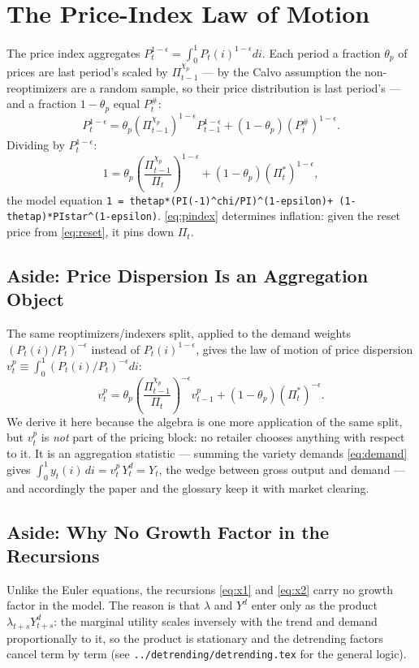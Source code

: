 \documentclass[11pt]{article}
\begin{document}
\section{The Price-Index Law of Motion}

The price index aggregates $P_t^{1-\epsilon} = \int_0^1 P_t(i)^{1-\epsilon}di$.
Each period a fraction $\theta_p$ of prices are last period's scaled by
$\Pi_{t-1}^{\chi_p}$ --- by the Calvo assumption the non-reoptimizers are a random
sample, so their price distribution is last period's --- and a fraction
$1-\theta_p$ equal $P_t^{\#}$:
\begin{equation*}
    P_t^{1-\epsilon}
    = \theta_p \left(\Pi_{t-1}^{\chi_p}\right)^{1-\epsilon} P_{t-1}^{1-\epsilon}
    + \left(1-\theta_p\right) \left(P_t^{\#}\right)^{1-\epsilon}.
\end{equation*}
Dividing by $P_t^{1-\epsilon}$:
\begin{equation}\label{eq:pindex}
    1 = \theta_p \left(\frac{\Pi_{t-1}^{\chi_p}}{\Pi_t}\right)^{1-\epsilon}
    + \left(1-\theta_p\right)\left(\Pi_t^{*}\right)^{1-\epsilon},
\end{equation}
the model equation \texttt{1 = thetap*(PI(-1)\^{}chi/PI)\^{}(1-epsilon)+
(1-thetap)*PIstar\^{}(1-epsilon)}. \eqref{eq:pindex} determines inflation: given
the reset price from \eqref{eq:reset}, it pins down $\Pi_t$.

\subsection{Aside: Price Dispersion Is an Aggregation Object}

The same reoptimizers/indexers split, applied to the demand weights
$\left(P_t(i)/P_t\right)^{-\epsilon}$ instead of $P_t(i)^{1-\epsilon}$, gives the
law of motion of price dispersion $v_t^{p} \equiv \int_0^1
\left(P_t(i)/P_t\right)^{-\epsilon} di$:
\begin{equation}\label{eq:vp}
    v_t^{p} = \theta_p \left(\frac{\Pi_{t-1}^{\chi_p}}{\Pi_t}\right)^{-\epsilon}
    v_{t-1}^{p} + \left(1-\theta_p\right)\left(\Pi_t^{*}\right)^{-\epsilon}.
\end{equation}
We derive it here because the algebra is one more application of the same split,
but $v_t^{p}$ is \emph{not} part of the pricing block: no retailer chooses
anything with respect to it. It is an aggregation statistic --- summing the variety
demands \eqref{eq:demand} gives $\int_0^1 y_t(i)\,di = v_t^{p}\,Y_t^{d} = Y_t$,
the wedge between gross output and demand --- and accordingly the paper and the
glossary keep it with market clearing.

\subsection{Aside: Why No Growth Factor in the Recursions}

Unlike the Euler equations, the recursions \eqref{eq:x1} and \eqref{eq:x2} carry no
growth factor in the model. The reason is that $\lambda$ and $Y^{d}$ enter only as
the product $\lambda_{t+s} Y_{t+s}^{d}$: the marginal utility scales inversely
with the trend and demand proportionally to it, so the product is stationary and
the detrending factors cancel term by term (see
\texttt{../detrending/detrending.tex} for the general logic).
\end{document}
